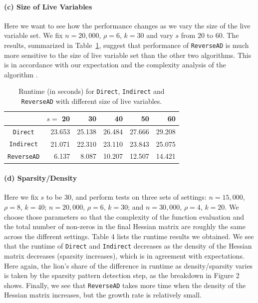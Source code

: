 \documentclass[10pt, a4paper, english]{article}
\begin{document}
\paragraph{(c) Size of Live Variables} 
Here we want to see how the performance changes as we vary the size of the live variable set.
We fix $n = 20,000$, $\rho = 6$, $k = 30$ and vary $s$ from $20$ to $60$. The results, summarized in Table~\ref{tab:live}, suggest that performance of {\tt ReverseAD} is much more sensitive to the size of live variable set than the other two algorithms. This is in accordance with our expectation and the complexity analysis of the algorithm \cite{wang2016capitalizing}.
\begin{table}[htbp]
\begin{center}
\begin{tabular}{ | c | r | r | r | r | r |}
\hline
& $s=$ 20 & 30 & 40 & 50 & 60 \\
\hline
{\tt Direct} & 23.653 & 25.138 & 26.484 & 27.666 & 29.208\\
{\tt Indirect} & 21.071 & 22.310 & 23.110 & 23.843 & 25.075\\
{\tt ReverseAD} & 6.137 & 8.087 & 10.207 & 12.507 & 14.421\\
\hline 
\end{tabular}
\caption{Runtime (in seconds) for {\tt Direct}, {\tt Indirect} and {\tt ReverseAD} with different size of live variables.}
\label{tab:live}
\end{center}
\end{table}

\paragraph{(d) Sparsity/Density} 
Here we fix $s$ to be  $30$, and perform tests on three sets of settings: $n=15,000$, $\rho = 8$, $k=40$; $n=20,000$, $\rho=6$, $k=30$; and $n=30,000$, $\rho=4$, $k=20$. 
We choose those parameters so that the complexity of the function evaluation and the total number of non-zeros in the final Hessian matrix are roughly the same across the different settings. 
Table 4 lists the runtime results we obtained.
We see that the runtime of {\tt Direct} and {\tt Indirect} decreases as the density of the Hessian matrix decreases (sparsity increases), which is in agreement with expectations.
Here again, the lion's share of the difference in runtime as density/sparsity varies is taken by the sparsity pattern detection step, as the breakdown in Figure 2 shows. 
Finally, we see that {\tt ReverseAD} takes more time when the density of the Hessian matrix increases, but the growth rate is relatively small.
\end{document}
